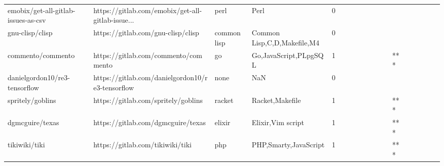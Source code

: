 \begin{tabular}{llllrlllllllllllll}
emobix/get-all-gitlab-issues-as-csv                &  https://gitlab.com/emobix/get-all-gitlab-issue... &              perl &                                               Perl &       0 &         &        &           &                &                 &        &           &           &          &          &       &              &          \\
gnu-clisp/clisp                                    &                 https://gitlab.com/gnu-clisp/clisp &       common lisp &                        Common Lisp,C,D,Makefile,M4 &       0 &         &        &           &                &                 &        &           &           &          &          &       &              &          \\
commento/commento                                  &               https://gitlab.com/commento/commento &                go &                              Go,JavaScript,PLpgSQL &       1 &         &        &           &                &                 &        &           &       *** &          &          &       &              &          \\
danielgordon10/re3-tensorflow                      &   https://gitlab.com/danielgordon10/re3-tensorflow &              none &                                                NaN &       0 &         &        &           &                &                 &        &           &           &          &          &       &              &          \\
spritely/goblins                                   &                https://gitlab.com/spritely/goblins &            racket &                                    Racket,Makefile &       1 &         &        &           &                &                 &        &           &       *** &          &          &       &              &          \\
dgmcguire/texas                                    &                 https://gitlab.com/dgmcguire/texas &            elixir &                                  Elixir,Vim script &       1 &         &        &           &                &                 &        &           &       *** &          &          &       &              &          \\
tikiwiki/tiki                                      &                   https://gitlab.com/tikiwiki/tiki &               php &                              PHP,Smarty,JavaScript &       1 &         &        &           &                &                 &        &           &       *** &          &          &       &              &          \\

\end{tabular}
